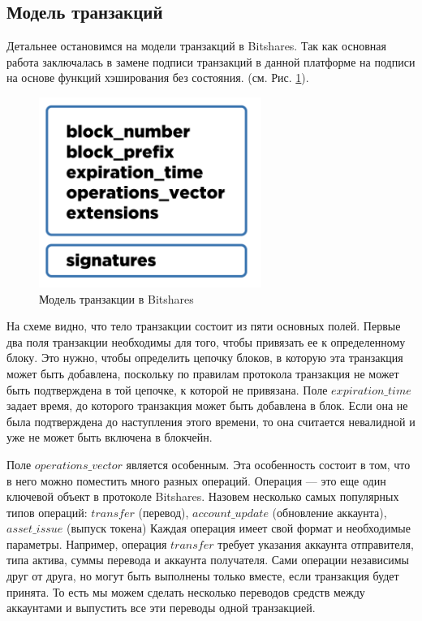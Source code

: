 \documentclass[a4paper, 14pt]{extarticle}
\begin{document}
\subsection{Модель транзакций}
Детальнее остановимся на модели транзакций в Bitshares. Так как основная работа заключалась в замене подписи транзакций в данной платформе на подписи на основе функций хэширования без состояния. (см. Рис. \ref{fig:Bitshares_trx_model}).

\begin{figure}[h]
    \centering
    \includegraphics[scale=0.5]{Bitshares_trx_model.png}
    \caption{Модель транзакции в Bitshares}
    \label{fig:Bitshares_trx_model}
\end{figure}

На схеме видно, что тело транзакции состоит из пяти основных полей. Первые два поля транзакции необходимы для того, чтобы привязать ее к определенному блоку. Это нужно, чтобы определить цепочку блоков, в которую эта транзакция может быть добавлена, поскольку по правилам протокола транзакция не может быть подтверждена в той цепочке, к которой не привязана. Поле $expiration\_time$ задает время, до которого транзакция может быть добавлена в блок. Если она не была подтверждена до наступления этого времени, то она считается невалидной и уже не может быть включена в блокчейн.

Поле $operations\_vector$ является особенным. Эта особенность состоит в том, что в него можно поместить много разных операций. Операция — это еще один ключевой объект в протоколе Bitshares. Назовем несколько самых популярных типов операций: $transfer$ (перевод), $account\_update$ (обновление аккаунта), $asset\_issue$ (выпуск токена) Каждая операция имеет свой формат и необходимые параметры. Например, операция $transfer$ требует указания аккаунта отправителя, типа актива, суммы перевода и аккаунта получателя. Сами операции независимы друг от друга, но могут быть выполнены только вместе, если транзакция будет принята. То есть мы можем сделать несколько переводов средств между аккаунтами и выпустить все эти переводы одной транзакцией.
\end{document}
